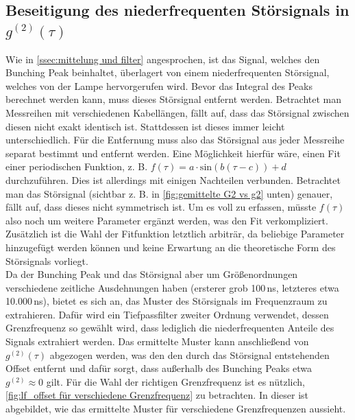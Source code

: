 \subsection{Beseitigung des niederfrequenten Störsignals in \texorpdfstring{$g^{(2)}(\tau)$}{g2}}
\label{ssec:Beseitigung des niederfrequenten Störsignals}
Wie in \autoref{ssec:mittelung und filter} angesprochen, ist das Signal, welches den Bunching Peak beinhaltet, überlagert von einem niederfrequenten Störsignal, welches von der Lampe hervorgerufen wird. 
Bevor das Integral des Peaks berechnet werden kann, muss dieses Störsignal entfernt werden. 
Betrachtet man Messreihen mit verschiedenen Kabellängen, fällt auf, dass das Störsignal zwischen diesen nicht exakt identisch ist. 
Stattdessen ist dieses immer leicht unterschiedlich. 
Für die Entfernung muss also das Störsignal aus jeder Messreihe separat bestimmt und entfernt werden. 
Eine Möglichkeit hierfür wäre, einen Fit einer periodischen Funktion, z. B. $f(\tau) = a\cdot\mathrm{sin}(b(\tau-c))+d$ durchzuführen. 
Dies ist allerdings mit einigen Nachteilen verbunden. 
Betrachtet man das Störsignal (sichtbar z. B. in \autoref{fig:gemittelte G2 vs g2} unten) genauer, fällt auf, dass dieses nicht symmetrisch ist. 
Um es voll zu erfassen, müsste $f(\tau)$ also noch um weitere Parameter ergänzt werden, was den Fit verkompliziert. 
Zusätzlich ist die Wahl der Fitfunktion letztlich arbiträr, da beliebige Parameter hinzugefügt werden können und keine Erwartung an die theoretische Form des Störsignals vorliegt. \\
Da der Bunching Peak und das Störsignal aber um Größenordnungen verschiedene zeitliche Ausdehnungen haben (ersterer grob 100\,ns, letzteres etwa 10{.}000\,ns), bietet es sich an, das Muster des Störsignals im Frequenzraum zu extrahieren. 
Dafür wird ein Tiefpassfilter zweiter Ordnung verwendet, dessen Grenzfrequenz so gewählt wird, dass lediglich die niederfrequenten Anteile des Signals extrahiert werden. 
Das ermittelte Muster kann anschließend von $g^{(2)}(\tau)$ abgezogen werden, was den den durch das Störsignal entstehenden Offset entfernt und dafür sorgt, dass außerhalb des Bunching Peaks etwa $g^{(2)}\approx 0$ gilt. 
Für die Wahl der richtigen Grenzfrequenz ist es nützlich, \autoref{fig:lf_offset für verschiedene Grenzfrequenz} zu betrachten. 
In dieser ist abgebildet, wie das ermittelte Muster für verschiedene Grenzfrequenzen aussieht. 
